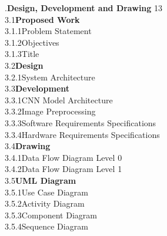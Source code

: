 \documentclass[12pt,a4paper]{report}
\begin{document}
.\quad \textbf{Design, Development and Drawing} \hfill 13\\[12pt]
\hspace*{1cm}3.1\quad \textbf{Proposed Work} \\[12pt]
\hspace*{2cm}3.1.1\quad Problem Statement \\[12pt]
\hspace*{2cm}3.1.2\quad Objectives \\[12pt]
\hspace*{2cm}3.1.3\quad Title \\[12pt]
\hspace*{1cm}3.2\quad \textbf{Design} \\[12pt]
\hspace*{2cm}3.2.1\quad System Architecture \\[12pt]
\hspace*{1cm}3.3\quad \textbf{Development} \\[12pt]
\hspace*{2cm}3.3.1\quad CNN Model Architecture \\[12pt]
\hspace*{2cm}3.3.2\quad Image Preprocessing \\[12pt]
\hspace*{2cm}3.3.3\quad Software Requirements Specifications \\[12pt]
\hspace*{2cm}3.3.4\quad Hardware Requirements Specifications \\[12pt]
\hspace*{1cm}3.4\quad \textbf{Drawing} \\[12pt]
\hspace*{2cm}3.4.1\quad Data Flow Diagram Level 0 \\[12pt]
\hspace*{2cm}3.4.2\quad Data Flow Diagram Level 1 \\[12pt]
\hspace*{1cm}3.5\quad \textbf{UML Diagram} \\[12pt]
\hspace*{2cm}3.5.1\quad Use Case Diagram \\[12pt]
\hspace*{2cm}3.5.2\quad Activity Diagram \\[12pt]
\hspace*{2cm}3.5.3\quad Component Diagram \\[12pt]
\hspace*{2cm}3.5.4\quad Sequence Diagram \\[20pt]
\end{document}
